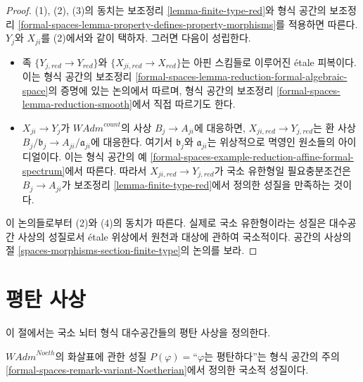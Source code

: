 \begin{proof}
(1), (2), (3)의 동치는 보조정리 \ref{lemma-finite-type-red}와
형식 공간의 보조정리
\ref{formal-spaces-lemma-property-defines-property-morphisms}를 적용하면 따른다.
$Y_j$와 $X_{ji}$를 (2)에서와 같이 택하자. 그러면 다음이 성립한다.
\begin{itemize}
\item 족 $\{Y_{j, red} \to Y_{red}\}$와
$\{X_{ji, red} \to X_{red}\}$는 아핀 스킴들로 이루어진 \'etale 피복이다.
이는 형식 공간의 보조정리
\ref{formal-spaces-lemma-reduction-formal-algebraic-space}의 증명에 있는
논의에서 따르며, 형식 공간의 보조정리
\ref{formal-spaces-lemma-reduction-smooth}에서 직접 따르기도 한다.
\item $X_{ji} \to Y_j$가 $\textit{WAdm}^{count}$의 사상
$B_j \to A_{ji}$에 대응하면, $X_{ji, red} \to Y_{j, red}$는 환 사상
$B_j/\mathfrak b_j \to A_{ji}/\mathfrak a_{ji}$에 대응한다.
여기서 $\mathfrak b_j$와 $\mathfrak a_{ji}$는 위상적으로 멱영인
원소들의 아이디얼이다. 이는 형식 공간의 예
\ref{formal-spaces-example-reduction-affine-formal-spectrum}에서 따른다.
따라서 $X_{ji, red} \to Y_{j, red}$가 국소 유한형일 필요충분조건은
$B_j \to A_{ji}$가 보조정리 \ref{lemma-finite-type-red}에서 정의한
성질을 만족하는 것이다.
\end{itemize}
이 논의들로부터 (2)와 (4)의 동치가 따른다. 실제로 국소 유한형이라는
성질은 대수공간 사상의 성질로서 \'etale 위상에서 원천과 대상에 관하여
국소적이다. 공간의 사상의 절
\ref{spaces-morphisms-section-finite-type}의 논의를 보라.
\end{proof}


\section{평탄 사상}
\label{section-flat}

\noindent
이 절에서는 국소 뇌터 형식 대수공간들의 평탄 사상을 정의한다.

\begin{lemma}
\label{lemma-flat-axioms}
$\textit{WAdm}^{Noeth}$의 화살표에 관한 성질
$P(\varphi)=$``$\varphi$는 평탄하다''는 형식 공간의 주의
\ref{formal-spaces-remark-variant-Noetherian}에서 정의한 국소적 성질이다.
\end{lemma}

